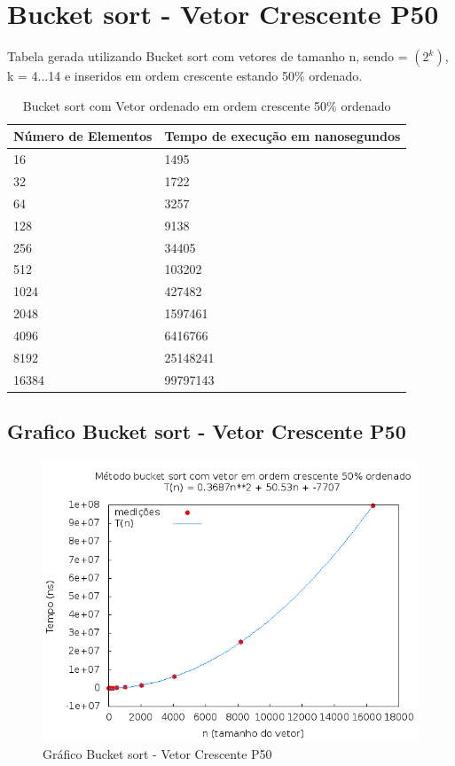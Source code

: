 \documentclass[12pt,a4paper,twoside]{report}
\begin{document}
\section{Bucket sort - Vetor Crescente P50}
Tabela gerada utilizando Bucket sort com vetores de tamanho n, sendo = $(2^k)$, k = 4...14 e inseridos em ordem crescente estando 50\% ordenado.

\begin{table}[H]
\centering
\caption{Bucket sort com Vetor ordenado em ordem crescente 50\% ordenado}
\label{my-label}
\begin{tabular}{|l|l|}
\hline
\multicolumn{1}{|c|}{\textbf{Número de Elementos}} & \multicolumn{1}{c|}{\textbf{Tempo de execução em nanosegundos}} \\ \hline
16 & 1495 \\ \hline
32 & 1722 \\ \hline
64 & 3257 \\ \hline
128 & 9138 \\ \hline
256 & 34405 \\ \hline
512 & 103202 \\ \hline
1024 & 427482 \\ \hline
2048 & 1597461 \\ \hline
4096 & 6416766 \\ \hline
8192 & 25148241 \\ \hline
16384 & 99797143 \\ \hline
\end{tabular}
\end{table}

\subsection{Grafico Bucket sort - Vetor Crescente P50}
\begin{figure}[H]
    \centering
    \includegraphics[width=0.7\linewidth]{graficos/Bucket/vIntCrescenteP50/vIntCrescenteP50.png}
  \caption{Gráfico Bucket sort - Vetor Crescente P50}
\end{figure}
\end{document}
